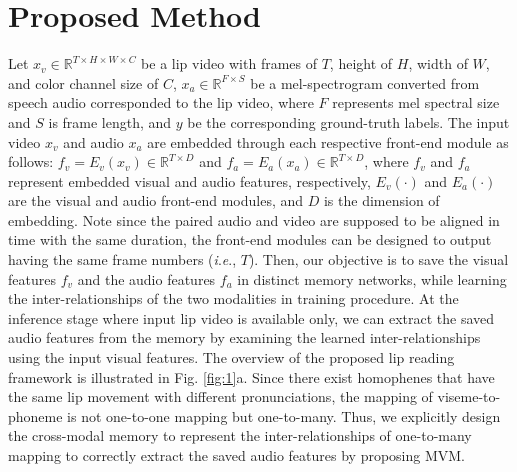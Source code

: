\documentclass[letterpaper]{article} \usepackage{aaai22}  \usepackage{times}  \usepackage{helvet}  \usepackage{courier}  \usepackage[hyphens]{url}  \usepackage{graphicx} \urlstyle{rm} \def\UrlFont{\rm}  \usepackage{natbib}  \usepackage{caption} \DeclareCaptionStyle{ruled}{labelfont=normalfont,labelsep=colon,strut=off} \frenchspacing  \setlength{\pdfpagewidth}{8.5in}  \setlength{\pdfpageheight}{11in}  \usepackage{algorithm}
\newcommand{\ie}{\textit{i}.\textit{e}.}
\begin{document}
\section{Proposed Method}
Let $x_v \in \mathbb{R}^{T \times H \times W \times C}$ be a lip video with frames of $T$, height of $H$, width of $W$, and color channel size of $C$, $x_a \in \mathbb{R}^{F\times S}$ be a mel-spectrogram converted from speech audio corresponded to the lip video, where $F$ represents mel spectral size and $S$ is frame length, and $y$ be the corresponding ground-truth labels. The input video $x_v$ and audio $x_a$ are embedded through each respective front-end module as follows: $f_v=E_v(x_v)\in\mathbb{R}^{T\times D}$ and $f_a=E_a(x_a)\in\mathbb{R}^{T\times D}$, where $f_v$ and $f_a$ represent embedded visual and audio features, respectively, $E_v(\cdot)$ and $E_a(\cdot)$ are the visual and audio front-end modules, and $D$ is the dimension of embedding. Note since the paired audio and video are supposed to be aligned in time with the same duration, the front-end modules can be designed to output having the same frame numbers (\ie, $T$). Then, our objective is to save the visual features $f_v$ and the audio features $f_a$ in distinct memory networks, while learning the inter-relationships of the two modalities in training procedure. At the inference stage where input lip video is available only, we can extract the saved audio features from the memory by examining the learned inter-relationships using the input visual features. 
The overview of the proposed lip reading framework is illustrated in Fig. \ref{fig:1}a. Since there exist homophenes that have the same lip movement with different pronunciations, the mapping of viseme-to-phoneme is not one-to-one mapping but one-to-many. Thus, we explicitly design the cross-modal memory to represent the inter-relationships of one-to-many mapping to correctly extract the saved audio features by proposing MVM.
\end{document}
